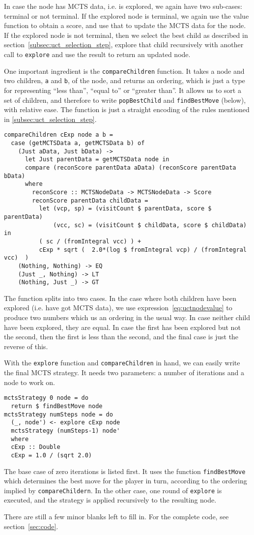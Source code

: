 In case the node has MCTS data, i.e. is explored, we again have two sub-cases: terminal or not terminal.
If the explored node is terminal, we again use the value function to obtain a score, and use that to update the MCTS data for the node.
If the explored node is not terminal, then we select the best child as described in section~\ref{subsec:uct_selection_step}, explore that child recursively with another call to \texttt{explore} and use the result to return an updated node.

One important ingredient is the \texttt{compareChildren} function. It takes a node and two children, \texttt{a} and \texttt{b}, of the node, and returns an ordering, which is just a type for representing ``less than'', ``equal to'' or ``greater than''.
It allows us to sort a set of children, and therefore to write \texttt{popBestChild} and \texttt{findBestMove} (below), with relative ease.
The function is just a straight encoding of the rules mentioned in \ref{subsec:uct_selection_step}.
\begin{lstlisting}[frame=single]
compareChildren cExp node a b =
  case (getMCTSData a, getMCTSData b) of
    (Just aData, Just bData) ->
      let Just parentData = getMCTSData node in
      compare (reconScore parentData aData) (reconScore parentData bData)    
      where
        reconScore :: MCTSNodeData -> MCTSNodeData -> Score
        reconScore parentData childData =
          let (vcp, sp) = (visitCount $ parentData, score $ parentData)
              (vcc, sc) = (visitCount $ childData, score $ childData) in
          ( sc / (fromIntegral vcc) ) +
          cExp * sqrt (  2.0*(log $ fromIntegral vcp) / (fromIntegral vcc)  )
    (Nothing, Nothing) -> EQ
    (Just _, Nothing) -> LT
    (Nothing, Just _) -> GT
\end{lstlisting}
The function splits into two cases. In the case where both children have been explored (i.e. have got MCTS data), we use expression~\ref{eq:uctnodevalue} to produce two numbers which us an ordering in the usual way. In case neither child have been explored, they are equal. In case the first has been explored but not the second, then the first is less than the second, and the final case is just the reverse of this.

With the \texttt{explore} function and \texttt{compareChildren} in hand, we can easily write the final MCTS strategy. It needs two parameters: a number of iterations and a node to work on.

\begin{minipage}{\linewidth}
\begin{lstlisting}[frame=single]
mctsStrategy 0 node = do
  return $ findBestMove node
mctsStrategy numSteps node = do
  (_, node') <- explore cExp node
  mctsStrategy (numSteps-1) node'
  where
  cExp :: Double  
  cExp = 1.0 / (sqrt 2.0)
\end{lstlisting}
\end{minipage}
The base case of zero iterations is listed first. It uses the function \texttt{findBestMove} which determines the best move for the player in turn, according to the ordering implied by \texttt{compareChildern}. In the other case, one round of \texttt{explore} is executed, and the strategy is applied recursively to the resulting node.

There are still a few minor blanks left to fill in. For the complete code, see section~\ref{sec:code}.
